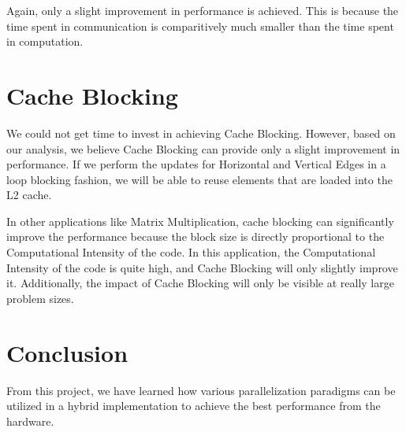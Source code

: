 \documentclass[]{article}
\begin{document}
Again, only a slight improvement in performance is achieved. This is because the time spent in communication is
comparitively much smaller than the time spent in computation.

\section{Cache Blocking}
We could not get time to invest in achieving Cache Blocking. However, based on our analysis, we believe Cache Blocking can provide only a slight improvement in performance. If we perform the updates for Horizontal and Vertical Edges in a loop blocking fashion, we will be able to reuse elements that are loaded into the L2 cache.

In other applications like Matrix Multiplication, cache blocking can significantly improve the performance
because the block size is directly proportional to the Computational Intensity of the code. In this application,
the Computational Intensity of the code is quite high, and Cache Blocking will only slightly improve it. Additionally,
the impact of Cache Blocking will only be visible at really large problem sizes.

\section{Conclusion}
From this project, we have learned how various parallelization paradigms can be utilized in a hybrid implementation
to achieve the best performance from the hardware.
\end{document}
